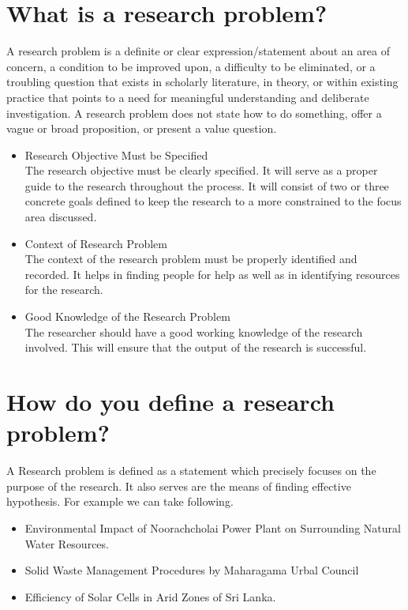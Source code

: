 \documentclass[12pt,a4paper,oneside]{article}
\begin{document}
\section{What is a research problem?}

A research problem is a definite or clear expression/statement about an area of concern, a condition to be improved upon, a difficulty to be eliminated, or a troubling question that exists in scholarly literature, in theory, or within existing practice that points to a need for meaningful understanding and deliberate investigation. A research problem does not state how to do something, offer a vague or broad proposition, or present a value question.

\begin{itemize}
\item Research Objective Must be Specified\\
The research objective must be clearly specified. It will serve as a proper guide to the research throughout the process. It will consist of two or three concrete goals defined to keep the research to a more constrained to the focus area discussed. 

\item Context of Research Problem
\\
The context of the research problem must be properly identified and recorded. It helps in finding people for help as well as in identifying resources for the research. 

\item Good Knowledge of the Research Problem
\\ 
The researcher should have a good working knowledge of the research involved. This will ensure that the output of the research is successful. 
\end{itemize}

\section{How do you define a research problem?}
A Research problem is defined as a statement which precisely focuses on the purpose of the research. It also serves are the means of finding effective hypothesis.  For example we can take following.

\begin{itemize}

\item Environmental Impact of Noorachcholai Power Plant on Surrounding Natural Water Resources.
\item Solid Waste Management Procedures by Maharagama Urbal Council
\item Efficiency of Solar Cells in Arid Zones of Sri Lanka.



\end{itemize}
\end{document}
